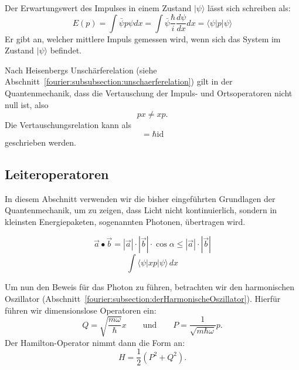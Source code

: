 Der Erwartungswert des Impulses in einem Zustand $|\psi\rangle$ lässt sich schreiben als:
\begin{equation}
	E(p) = \int \bar{\psi}p\psi dx
	= \int \bar{\psi} \frac{\hbar}{i} \frac{d\psi}{dx} dx
	= \langle \psi | p | \psi \rangle
\end{equation}
Er gibt an, welcher mittlere Impuls gemessen wird, wenn sich das System im Zustand $|\psi\rangle$ befindet.

Nach Heisenbergs Unschärferelation (siehe Abschnitt~\ref{fourier:subsubsection:unschaerferelation}) gilt in der Quantenmechanik, dass die Vertauschung der Impuls- und Ortsoperatoren nicht null ist, also
\begin{equation}
	px \neq xp.
\end{equation}
Die Vertauschungsrelation kann als
\begin{equation}
	[x, p] = \hbar \text{id}
\end{equation}
geschrieben werden.

\subsection{Leiteroperatoren\label{fourier:subsection:Leiteroperatoren}} %
In diesem Abschnitt verwenden wir die bisher eingeführten Grundlagen der Quantenmechanik, um zu zeigen, dass Licht nicht kontinuierlich, sondern in kleinsten Energiepaketen, sogenannten Photonen, übertragen wird.

\begin{equation}
	\vec{a}\bullet\vec{b} = |\vec{a}| \cdot |\vec{b}| \cdot \cos{\alpha} \leq |\vec{a}| \cdot |\vec{b}|
\end{equation}
\begin{equation}
	\int \langle \psi |xp|\psi \rangle\,dx	%
\end{equation}

Um nun den Beweis für das Photon zu führen, betrachten wir den harmonischen Oszillator (Abschnitt~\ref{fourier:subsection:derHarmonischeOszillator}).
Hierfür führen wir dimensionslose Operatoren ein:
\[ 
Q = \sqrt{\frac{m\omega}{\hbar}}x
\qquad\text{und}\qquad
P = \frac{1}{\sqrt{m\hbar\omega}}p.
\]
Der Hamilton-Operator nimmt dann die Form an:
\begin{equation}
	H = \frac{1}{2}(P^2 + Q^2).
\end{equation}

